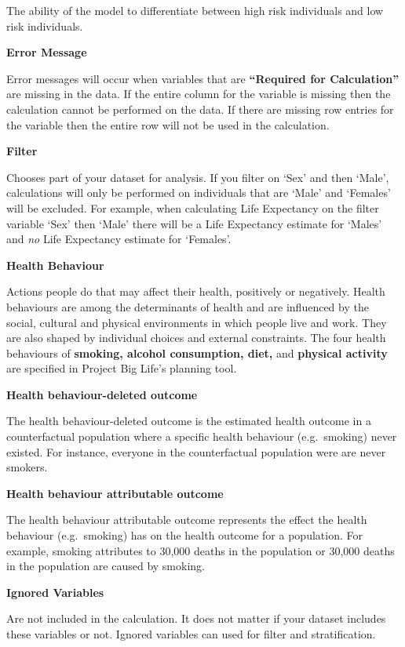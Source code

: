 \documentclass[]{book}
\begin{document}
The ability of the model to differentiate between high risk individuals
and low risk individuals.

\textbf{Error Message}

Error messages will occur when variables that are
\textbf{``Required for Calculation''} are missing in the data. If the
entire column for the variable is missing then the calculation cannot be
performed on the data. If there are missing row entries for the variable
then the entire row will not be used in the calculation.

\textbf{Filter}

Chooses part of your dataset for analysis. If you filter on
`Sex' and then `Male', calculations will only be performed on
individuals that are `Male' and `Females' will be excluded. For example,
when calculating Life Expectancy on the filter variable `Sex' then
`Male' there will be a Life Expectancy estimate for `Males' and
\emph{no} Life Expectancy estimate for `Females'.

\textbf{Health Behaviour}

Actions people do that may affect their health, positively or
negatively. Health behaviours are among the determinants of health and
are influenced by the social, cultural and physical environments in
which people live and work.\citep{StatsCan2010} They are also shaped by
individual choices and external constraints.\citep{StatsCan2010} The
four health behaviours of \textbf{smoking, alcohol consumption, diet,}
and \textbf{physical activity} are specified in Project Big Life's
planning tool.

\textbf{Health behaviour-deleted outcome}

The health behaviour-deleted outcome is the estimated health outcome in
a counterfactual population where a specific health behaviour
(e.g.~smoking) never existed. For instance, everyone in the
counterfactual population were are never smokers.

\textbf{Health behaviour attributable outcome}

The health behaviour attributable outcome represents the effect the
health behaviour (e.g.~smoking) has on the health outcome for a
population. For example, smoking attributes to 30,000 deaths in the
population or 30,000 deaths in the population are caused by smoking.

\textbf{Ignored Variables}

Are not included in the calculation. It does not matter if your dataset
includes these variables or not. Ignored variables can used for filter
and stratification.
\end{document}
